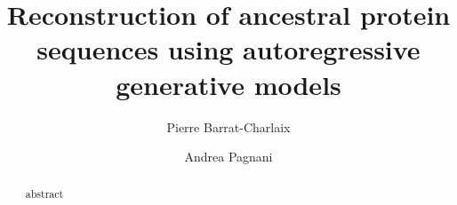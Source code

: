 \documentclass[a4paper,preprint]{revtex4-2}
\begin{document}
\title{Reconstruction of ancestral protein sequences using autoregressive generative models}

\author{Pierre Barrat-Charlaix}

\author{Andrea Pagnani}

\date{}

\begin{abstract}
abstract
\end{abstract}

\maketitle




\newpage



\newpage
\newpage
\appendix
\setcounter{figure}{0}
\renewcommand{\figurename}{Figure S}
\setcounter{table}{0}
\renewcommand{\tablename}{Table S}
\onecolumngrid


\end{document}
